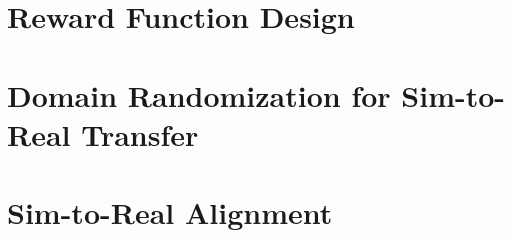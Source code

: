 \section{Reward Function Design}\label{sec:backup_reward}

%
%
%
%
%

\section{Domain Randomization for Sim-to-Real Transfer}\label{sec:dr}

%
%

\section{Sim-to-Real Alignment}\label{sec:sim2real_alignment}

